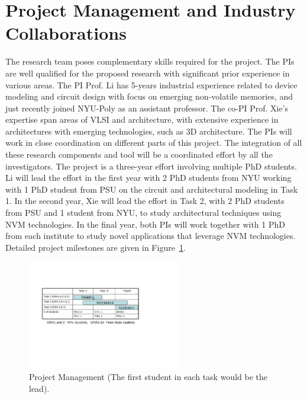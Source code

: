 
\section{Project Management and Industry Collaborations}
%

The research team poses complementary skills required for the
project. The PIs are well qualified for the proposed research with
significant prior experience in various areas. The PI Prof. Li has
5-years industrial experience related to device modeling and circuit design with focus
on emerging non-volatile memories, and just recently joined NYU-Poly as
an assistant professor. The co-PI Prof. Xie's
expertise span areas of VLSI and architecture, with extensive experience
in architectures with emerging technologies, such as 3D architecture.
The PIs will work in close coordination on
different parts of this project. The
integration of all these research components and tool will be a
coordinated effort by all the investigators. The project is a three-year
effort involving multiple PhD students. Li will lead the effort in
the first year with 2 PhD students from NYU working with 1 PhD student
from PSU on the circuit and architectural modeling in Task 1. In the second
year, Xie will lead the effort in Task 2, with 2 PhD students from PSU and
1 student from NYU, to study architectural techniques using NVM technologies. In the final year, both PIs will work together with 1 PhD from each institute to study novel applications that leverage NVM technologies.
Detailed project milestones are given in Figure~\ref{fig:plan}.

\begin{figure}[htp]
\centering
\includegraphics[width=0.6\textwidth]{./figure/schedule.pdf}
\vspace{-10pt} \caption{Project Management (The first
student in each task would be the lead).}\label{fig:plan}
\end{figure}



